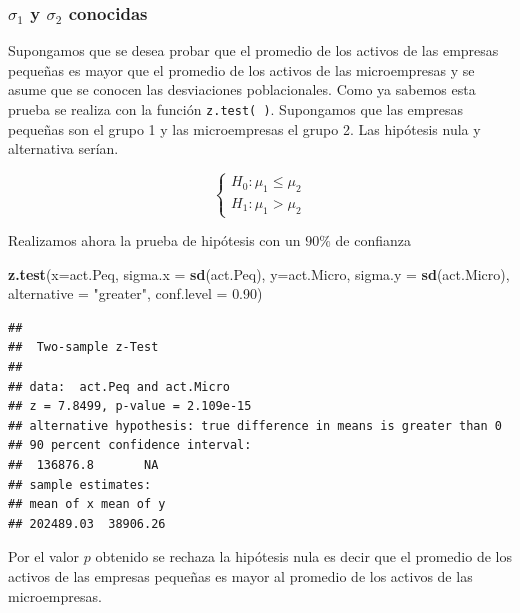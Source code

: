 \documentclass[letterpaper,]{book}
\newenvironment{Shaded}{\begin{snugshade}}{\end{snugshade}}
\newcommand{\DataTypeTok}[1]{\textcolor[rgb]{0.13,0.29,0.53}{#1}}
\newcommand{\FloatTok}[1]{\textcolor[rgb]{0.00,0.00,0.81}{#1}}
\newcommand{\KeywordTok}[1]{\textcolor[rgb]{0.13,0.29,0.53}{\textbf{#1}}}
\newcommand{\NormalTok}[1]{#1}
\newcommand{\StringTok}[1]{\textcolor[rgb]{0.31,0.60,0.02}{#1}}
\begin{document}
\hypertarget{sigma_1-y-sigma_2-conocidas-1}{%
\subsubsection{\texorpdfstring{\(\sigma_1\) y \(\sigma_2\) conocidas}{\textbackslash{}sigma\_1 y \textbackslash{}sigma\_2 conocidas}}\label{sigma_1-y-sigma_2-conocidas-1}}

Supongamos que se desea probar que el promedio de los activos de las empresas pequeñas es mayor que el promedio de los activos de las microempresas y se asume que se conocen las desviaciones poblacionales. Como ya sabemos esta prueba se realiza con la función \texttt{z.test(\ )}. Supongamos que las empresas pequeñas son el grupo 1 y las microempresas el grupo 2. Las hipótesis nula y alternativa serían.

\begin{equation} 
\begin{cases} 
H_0: \mu_1 \leq \mu_2 \\ 
H_1: \mu_1 > \mu_2
\end{cases} 
\end{equation}

Realizamos ahora la prueba de hipótesis con un \(90\%\) de confianza

\begin{Shaded}
\begin{Highlighting}[]
\KeywordTok{z.test}\NormalTok{(}\DataTypeTok{x=}\NormalTok{act.Peq, }\DataTypeTok{sigma.x =} \KeywordTok{sd}\NormalTok{(act.Peq), }
       \DataTypeTok{y=}\NormalTok{act.Micro, }\DataTypeTok{sigma.y =} \KeywordTok{sd}\NormalTok{(act.Micro),}
       \DataTypeTok{alternative =} \StringTok{"greater"}\NormalTok{, }\DataTypeTok{conf.level =} \FloatTok{0.90}\NormalTok{)}
\end{Highlighting}
\end{Shaded}

\begin{verbatim}
## 
##  Two-sample z-Test
## 
## data:  act.Peq and act.Micro
## z = 7.8499, p-value = 2.109e-15
## alternative hypothesis: true difference in means is greater than 0
## 90 percent confidence interval:
##  136876.8       NA
## sample estimates:
## mean of x mean of y 
## 202489.03  38906.26
\end{verbatim}

Por el valor \(p\) obtenido se rechaza la hipótesis nula es decir que el promedio de los activos de las empresas pequeñas es mayor al promedio de los activos de las microempresas.
\end{document}
